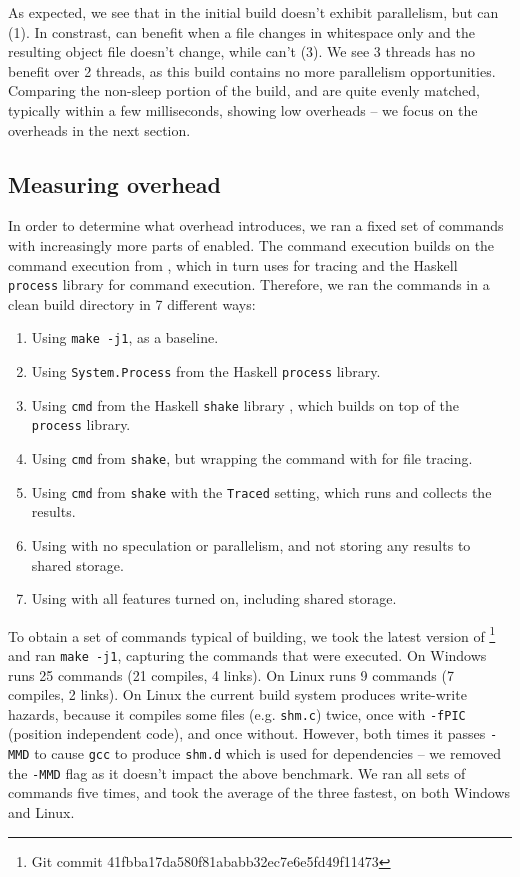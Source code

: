 As expected, we see that in the initial build \Rattle doesn't exhibit parallelism, but \Make can (1). In constrast, \Rattle can benefit when a file changes in whitespace only and the resulting object file doesn't change, while \Make can't (3). We see 3 threads has no benefit over 2 threads, as this build contains no more parallelism opportunities. Comparing the non-sleep portion of the build, \Make and \Rattle are quite evenly matched, typically within a few milliseconds, showing low overheads -- we focus on the overheads in the next section.

\subsection{Measuring overhead}
\label{sec:eval:overhead}

In order to determine what overhead \Rattle introduces, we ran a fixed set of commands with increasingly more parts of \Rattle enabled. The \Rattle command execution builds on the command execution from \Shake \cite{shake}, which in turn uses \Fsatrace for tracing and the Haskell \texttt{process} library for command execution. Therefore, we ran the commands in a clean build directory in 7 different ways:

\begin{enumerate}
\item Using \texttt{make -j1}, as a baseline.
\item Using \texttt{System.Process} from the Haskell \texttt{process} library.
\item Using \texttt{cmd} from the Haskell \texttt{shake} library \cite{shake}, which builds on top of the \texttt{process} library.
\item Using \texttt{cmd} from \texttt{shake}, but wrapping the command with \Fsatrace for file tracing.
\item Using \texttt{cmd} from \texttt{shake} with the \texttt{Traced} setting, which runs \Fsatrace and collects the results.
\item Using \Rattle with no speculation or parallelism, and not storing any results to shared storage.
\item Using \Rattle with all features turned on, including shared storage.
\end{enumerate}

To obtain a set of commands typical of building, we took the latest version of \Fsatrace\footnote{Git commit 41fbba17da580f81ababb32ec7e6e5fd49f11473} and ran \texttt{make -j1}, capturing the commands that were executed. On Windows \Fsatrace runs 25 commands (21 compiles, 4 links). On Linux \Fsatrace runs 9 commands (7 compiles, 2 links). On Linux the current build system produces write-write hazards, because it compiles some files (e.g. \texttt{shm.c}) twice, once with \texttt{-fPIC} (position independent code), and once without. However, both times it passes \texttt{-MMD} to cause \texttt{gcc} to produce \texttt{shm.d} which is used for dependencies -- we removed the \texttt{-MMD} flag as it doesn't impact the above benchmark. We ran all sets of commands five times, and took the average of the three fastest, on both Windows and Linux.

